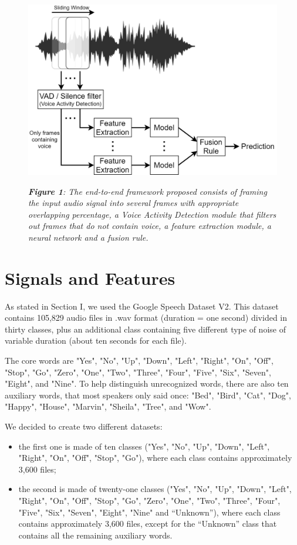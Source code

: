 \documentclass[conference]{IEEEtran}
\begin{document}
\begin{figure}
\centering
\includegraphics[scale=0.27]{End-To-End}

\begin{small}\textit{\textbf{Figure 1}: The end-to-end framework proposed consists of framing the input audio signal into several frames with appropriate overlapping percentage, a Voice Activity Detection module that filters out frames that do not contain voice, a feature extraction module, a neural network and a fusion rule.}
\end{small}
\end{figure}

\section{Signals and Features}
As stated in Section I, we used the Google Speech Dataset V2. This dataset contains 105,829 audio files in .wav format (duration =  one second) divided in thirty classes, plus an additional class containing five different type of noise of variable duration (about ten seconds for each file).

The core words are "Yes", "No", "Up", "Down", "Left", "Right", "On", "Off", "Stop", "Go", "Zero", "One", "Two", "Three", "Four", "Five", "Six", "Seven", "Eight", and "Nine". To help distinguish unrecognized words, there are also ten auxiliary words, that most speakers only said once: "Bed", "Bird", "Cat", "Dog", "Happy", "House", "Marvin", "Sheila", "Tree", and "Wow".

We decided to create two different datasets:
\begin{itemize}
\item the first one is made of ten classes ("Yes", "No", "Up", "Down", "Left", "Right", "On", "Off", "Stop", "Go"), where each class contains approximately 3,600 files;
\item the second is made of twenty-one classes ("Yes", "No", "Up", "Down", "Left", "Right", "On", "Off", "Stop", "Go", "Zero", "One", "Two", "Three", "Four", "Five", "Six", "Seven", "Eight", "Nine" and “Unknown”), where each class contains approximately 3,600 files, except for the “Unknown” class that contains all the remaining auxiliary words.
\end{itemize}
\end{document}
